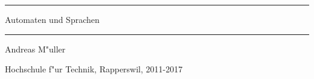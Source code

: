 \documentclass[a4paper,12pt]{book}
\begin{document}
\pagestyle{fancy}
\rhead{}
\frontmatter
\newcommand\HRule{\noindent\rule{\linewidth}{1.5pt}}
\begin{titlepage}
\HRule
\vspace*{10pt}
\begin{flushright}
{\Huge Automaten und Sprachen}
\end{flushright}
\HRule
\begin{flushright}
\vspace{30pt}
\LARGE
Andreas M"uller
\end{flushright}
\begin{center}
Hochschule f"ur Technik, Rapperswil, 2011-2017
\end{center}
\end{titlepage}
\hypersetup{
    linktoc=all,
    linkcolor=blue
}
\tableofcontents
\newtheorem{satz}{Satz}[chapter]
\newtheorem{hilfssatz}[satz]{Hilfssatz}
\newtheorem{definition}[satz]{Definition}
\newtheorem{annahme}[satz]{Annahme}
\newenvironment{beispiel}[1][Beispiel]{%
\begin{proof}[#1]%
\renewcommand{\qedsymbol}{$\bigcirc$}
}{\end{proof}}
\def\blank{\text{\textvisiblespace}}
\mainmatter
\begin{refsection}









\appendix

\vfill
\pagebreak
\ifodd\value{page}\else\null\clearpage\fi
\lhead{}
\rhead{}
\printbibliography[heading=subbibliography]
\end{refsection}


\end{document}
